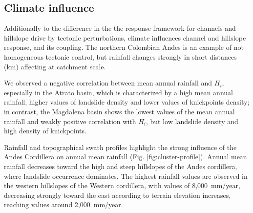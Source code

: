 \documentclass[draft]{agujournal2019}
\begin{document}
\subsection{Climate influence}
\par Additionally to the difference in the the response framework for channels and hillslope drive by tectonic perturbations, climate influences channel and hillslope response, and its coupling. The northern Colombian Andes is an example of not homogeneous tectonic control, but rainfall changes strongly in short distances (km) affecting at catchment scale. 

\par We observed a negative correlation between mean annual rainfall and $H_i$, especially in the Atrato basin, which is characterized by 
 a high mean annual rainfall, higher values of landslide density and lower values of knickpoints density; in contrast, the Magdalena basin shows the lowest values of the mean annual rainfall and weakly positive correlation with $H_i$, but low landslide density and high density of knickpoints. 
 
 \par Rainfall and topographical swath profiles highlight the strong influence of the Andes Cordillera on annual mean rainfall (Fig. \ref{fig:cluster-profile}). Annual mean rainfall decreases toward the high and steep hillslopes of the Andes cordillera, where landslide occurrence dominates. The highest rainfall values are observed in the western hillslopes of the Western cordillera, with values of 8,000~mm/year, decreasing strongly toward the east according to terrain elevation increases, reaching values around 2,000~mm/year.
\end{document}
